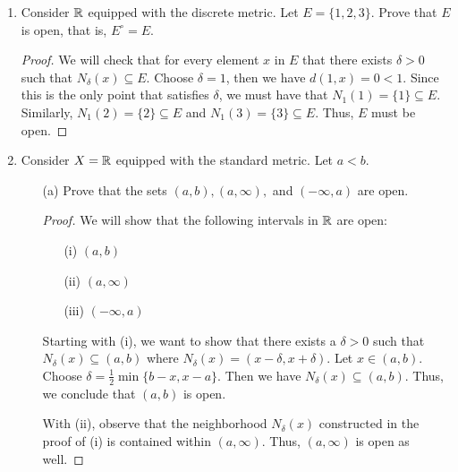 \documentclass[a4paper]{article}
\begin{document}
\begin{enumerate}
\begin{proof}
        For (ii), note that the complement of \( \emptyset \) is just \( X  \) itself. Since \( X  \) is open by part (a), we see that \( X^{c} = \emptyset \) must be closed.
        \end{proof}
    \item Consider \( \mathbb{R}  \) equipped with the discrete metric. Let \( E = \{ 1,2,3 \} \). Prove that \( E  \) is open, that is, \( E^{\circ} = E  \).
        \begin{proof}
        We will check that for every element \( x  \) in \( E  \) that there exists \( \delta > 0  \) such that \( {N}_{\delta}(x) \subseteq E  \). Choose \( \delta = 1  \), then we have \( d(1,x) = 0 < 1   \). Since this is the only point that satisfies \( \delta \), we must have that \( {N}_{1}(1) = \{ 1 \} \subseteq E   \). Similarly, \( {N}_{1}(2) = \{ 2 \}  \subseteq  E  \) and \( {N}_{1}(3) = \{ 3 \}  \subseteq E  \). Thus, \( E  \) must be open.
        \end{proof}
    \item Consider \( X = \mathbb{R}  \) equipped with the standard metric. Let \( a < b  \). 
        \begin{enumerate}
            \item[(a)] Prove that the sets \( (a,b), (a,\infty ),  \) and \( (-\infty , a) \) are open.
                \begin{proof}
                We will show that the following intervals in \( \mathbb{R}  \) are open:                
                \begin{enumerate}
                    \item[(i)] \( (a,b) \)
                    \item[(ii)] \( (a,\infty ) \)
                    \item[(iii)] \( (-\infty , a) \)
                \end{enumerate}
                Starting with (i), we want to show that there exists a \( \delta > 0  \) such that \( {N}_{\delta}(x) \subseteq (a,b) \) where \( {N}_{\delta}(x) = (x - \delta, x + \delta) \). Let \( x \in (a,b) \). Choose \( \delta = \frac{ 1 }{ 2 } \min \{ b - x, x - a  \}  \). Then we have \( {N}_{\delta}(x) \subseteq (a,b)  \). Thus, we conclude that \( (a,b) \) is open.

                With (ii), observe that the neighborhood \( {N}_{\delta}(x) \) constructed in the proof of (i) is contained within \( (a,\infty ) \). Thus, \( (a,\infty ) \) is open as well. 


\end{proof}
\end{enumerate}
\end{enumerate}
\end{document}
